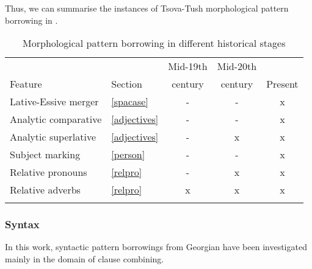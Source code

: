 Thus, we can summarise the instances of Tsova-Tush morphological pattern borrowing in .

\begin{table}
	\begin{tabular}{llccc}
    \lsptoprule
		&  & {Mid-19th} & {Mid-20th} &  \\
		Feature & Section & {century} & {century} & {Present}  \\
		\midrule
		Lative-Essive merger 	& \ref{spacase}	& - & - & x \\
		Analytic comparative 	& \ref{adjectives} & - & - & x \\
		Analytic superlative 	& \ref{adjectives} & - & x & x \\
		Subject marking 		& \ref{person} & - & - & x \\
		Relative pronouns		& \ref{relpro} & - & x & x \\
		Relative  adverbs		& \ref{relpro} & x & x & x \\
		\lspbottomrule
	\end{tabular}
	\caption{Morphological pattern borrowing in different historical stages}
	\label{concl-table2}
\end{table}	


\subsubsection{Syntax} \label{conclsyntax}
In this work, syntactic pattern borrowings from Georgian have been investigated mainly in the domain of clause combining.

